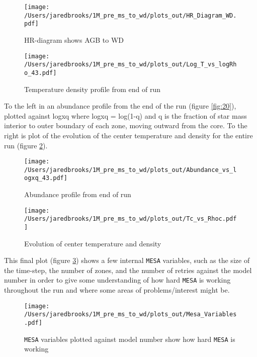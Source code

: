 \documentclass{article}
\begin{document}
        \begin{figure}[H]
          \begin{minipage}[b]{0.5\linewidth}
            \centering
            \texttt{[image: /Users/jaredbrooks/1M\_pre\_ms\_to\_wd/plots\_out/HR\_Diagram\_WD.pdf]}
            \caption{HR-diagram shows AGB to WD}
            \label{fig:18}
          \end{minipage}
          \hspace{0cm}
          \begin{minipage}[b]{0.5\linewidth}
            \centering
            \texttt{[image: /Users/jaredbrooks/1M\_pre\_ms\_to\_wd/plots\_out/Log\_T\_vs\_logRho\_43.pdf]}
            \caption{Temperature density profile from end of run}
            \label{fig:19}
          \end{minipage}
        \end{figure}

        To the left in an abundance profile from the end of the run (figure \ref{fig:20}), plotted against logxq where logxq = log(1-q) and q is the fraction of star mass interior to outer boundary of each zone, moving outward from the core.  To the right is plot of the evolution of the center temperature and density for the entire run (figure \ref{fig:21}).

        \begin{figure}[H]
          \begin{minipage}[b]{0.5\linewidth}
            \centering
            \texttt{[image: /Users/jaredbrooks/1M\_pre\_ms\_to\_wd/plots\_out/Abundance\_vs\_logxq\_43.pdf]}
            \caption{Abundance profile from end of run}
            \label{fig:20}
          \end{minipage}
          \hspace{0cm}
          \begin{minipage}[b]{0.5\linewidth}
            \centering
            \texttt{[image: /Users/jaredbrooks/1M\_pre\_ms\_to\_wd/plots\_out/Tc\_vs\_Rhoc.pdf]}
            \caption{Evolution of center temperature and density}
            \label{fig:21}
          \end{minipage}
        \end{figure}

        \pagebreak

        This final plot (figure \ref{fig:22}) shows a few internal \texttt{MESA} variables, such as the size of the time-step, the number of zones, and the number of retries against the model number in order to give some understanding of how hard \texttt{MESA} is working throughout the run and where some areas of problems/interest might be.

        \begin{figure}[H]
          \centering
          \texttt{[image: /Users/jaredbrooks/1M\_pre\_ms\_to\_wd/plots\_out/Mesa\_Variables.pdf]}
          \caption{\texttt{MESA} variables plotted against model number show how hard \texttt{MESA} is working}
          \label{fig:22}
        \end{figure}
\end{document}
